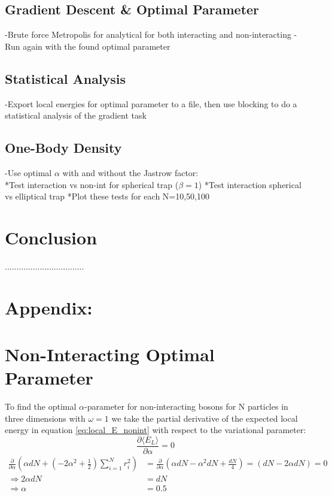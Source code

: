 \documentclass[12pt,a4paper,english]{article}
\begin{document}
\subsection{Gradient Descent \& Optimal Parameter}
\label{subsect:Result_gradient}
-Brute force Metropolis for analytical for both interacting and non-interacting
-Run again with the found optimal parameter
\subsection{Statistical Analysis}
\label{subsect:Result_analysis}
-Export local energies for optimal parameter to a file, then use blocking to do a statistical analysis of the gradient task
\subsection{One-Body Density}
\label{subsect:Result_onbody}
-Use optimal $\alpha$ with and without the Jastrow factor:\\
     *Test interaction vs non-int for spherical trap ($\beta=1$)
     *Test interaction spherical vs elliptical trap
     *Plot these tests for each N=10,50,100
\section{Conclusion}
\label{sect:Conclusion}
..................................

\appendix
\section*{Appendix:}
\section{Non-Interacting Optimal Parameter}
\label{appendix:Optimal_alpha}
To find the optimal $\alpha$-parameter for non-interacting bosons for N particles in three dimensions with $\omega=1$ we take the partial derivative of the expected local energy in equation \ref{eq:local_E_nonint} with respect to the variational parameter:
\[\frac{\partial \langle E_L\rangle}{\partial \alpha}=0\]
\begin{align*}
\frac{\partial}{\partial \alpha}\left(\alpha dN+(-2\alpha^2+\frac{1}{2})\sum_{i=1}^{N}r_i^2\right)&=\frac{\partial}{\partial \alpha}\left(\alpha dN-\alpha^2dN+\frac{dN}{4}\right)=(dN-2\alpha dN)=0\\
\Rightarrow 2\alpha dN&=dN\\
\Rightarrow \alpha&=0.5
\end{align*}
\end{document}
